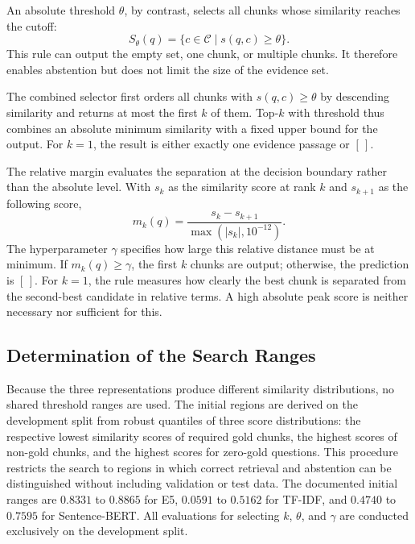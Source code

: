 \documentclass[11pt]{article}
\begin{document}
An absolute threshold $\theta$, by contrast, selects all chunks whose similarity reaches the cutoff:
\begin{equation}
S_{\theta}(q)=\{c\in\mathcal{C}\mid s(q,c)\geq\theta\}.
\end{equation}
This rule can output the empty set, one chunk, or multiple chunks. It therefore enables abstention but does not limit the size of the evidence set.

The combined selector first orders all chunks with $s(q,c)\geq\theta$ by descending similarity and returns at most the first $k$ of them. Top-$k$ with threshold thus combines an absolute minimum similarity with a fixed upper bound for the output. For $k=1$, the result is either exactly one evidence passage or $[\,]$.

The relative margin evaluates the separation at the decision boundary rather than the absolute level. With $s_k$ as the similarity score at rank $k$ and $s_{k+1}$ as the following score,
\begin{equation}
m_k(q)=\frac{s_k-s_{k+1}}{\max(|s_k|,10^{-12})}.
\end{equation}
The hyperparameter $\gamma$ specifies how large this relative distance must be at minimum. If $m_k(q)\geq\gamma$, the first $k$ chunks are output; otherwise, the prediction is $[\,]$. For $k=1$, the rule measures how clearly the best chunk is separated from the second-best candidate in relative terms. A high absolute peak score is neither necessary nor sufficient for this.

\subsection{Determination of the Search Ranges}

Because the three representations produce different similarity distributions, no shared threshold ranges are used. The initial regions are derived on the development split from robust quantiles of three score distributions: the respective lowest similarity scores of required gold chunks, the highest scores of non-gold chunks, and the highest scores for zero-gold questions. This procedure restricts the search to regions in which correct retrieval and abstention can be distinguished without including validation or test data. The documented initial ranges are $0.8331$ to $0.8865$ for E5, $0.0591$ to $0.5162$ for TF-IDF, and $0.4740$ to $0.7595$ for Sentence-BERT. All evaluations for selecting $k$, $\theta$, and $\gamma$ are conducted exclusively on the development split.
\end{document}
